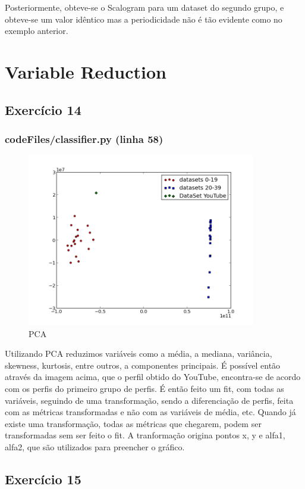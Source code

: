 \documentclass[pdftex,12pt,a4paper]{report}
\begin{document}
Posteriormente, obteve-se o Scalogram para um dataset do segundo grupo, e obteve-se um valor idêntico mas a periodicidade não é tão evidente como no exemplo anterior.

\newpage
\section{Variable Reduction}
\subsection{Exercício 14}
\subsubsection{codeFiles/classifier.py (linha 58)}

\begin{figure}[!htb]
\center
 \includegraphics[width=100mm,scale=1]{classifier/PCA.png}
 \caption{PCA}
 \label{fig:pca}
\end{figure}

Utilizando PCA reduzimos variáveis como a média, a mediana, variância, skewness, kurtosis, entre outros, a componentes principais. É possível então através da imagem acima, que o perfil obtido do YouTube, encontra-se de acordo com os perfis do primeiro grupo de perfis. É então feito um fit, com todas as variáveis, seguindo de uma transformação, sendo a diferenciação de perfis, feita com as métricas transformadas e não com as variáveis de média, etc.
Quando já existe uma transformação, todas as métricas que chegarem, podem ser transformadas sem ser feito o fit.
A tranformação origina pontos x, y e alfa1, alfa2, que são utilizados para preencher o gráfico.
\newpage
\subsection{Exercício 15}
\end{document}
